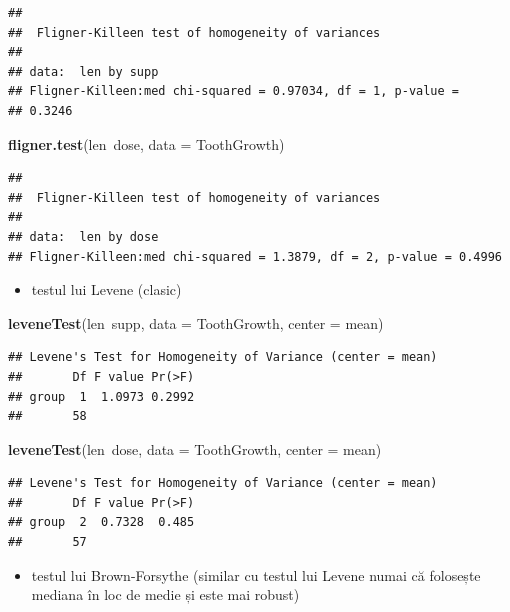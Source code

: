 \documentclass[]{article}
\newenvironment{Shaded}{\begin{snugshade}}{\end{snugshade}}
\newcommand{\KeywordTok}[1]{\textcolor[rgb]{0.13,0.29,0.53}{\textbf{{#1}}}}
\newcommand{\DataTypeTok}[1]{\textcolor[rgb]{0.13,0.29,0.53}{{#1}}}
\newcommand{\NormalTok}[1]{{#1}}
\providecommand{\tightlist}{%
  \setlength{\itemsep}{0pt}\setlength{\parskip}{0pt}}
\begin{document}
\begin{verbatim}
## 
##  Fligner-Killeen test of homogeneity of variances
## 
## data:  len by supp
## Fligner-Killeen:med chi-squared = 0.97034, df = 1, p-value =
## 0.3246
\end{verbatim}

\begin{Shaded}
\begin{Highlighting}[]
\KeywordTok{fligner.test}\NormalTok{(len~dose, }\DataTypeTok{data =} \NormalTok{ToothGrowth)}
\end{Highlighting}
\end{Shaded}

\begin{verbatim}
## 
##  Fligner-Killeen test of homogeneity of variances
## 
## data:  len by dose
## Fligner-Killeen:med chi-squared = 1.3879, df = 2, p-value = 0.4996
\end{verbatim}

\begin{itemize}
\tightlist
\item
  testul lui Levene (clasic)
\end{itemize}

\begin{Shaded}
\begin{Highlighting}[]
\KeywordTok{leveneTest}\NormalTok{(len~supp, }\DataTypeTok{data =} \NormalTok{ToothGrowth, }\DataTypeTok{center =} \NormalTok{mean)}
\end{Highlighting}
\end{Shaded}

\begin{verbatim}
## Levene's Test for Homogeneity of Variance (center = mean)
##       Df F value Pr(>F)
## group  1  1.0973 0.2992
##       58
\end{verbatim}

\begin{Shaded}
\begin{Highlighting}[]
\KeywordTok{leveneTest}\NormalTok{(len~dose, }\DataTypeTok{data =} \NormalTok{ToothGrowth, }\DataTypeTok{center =} \NormalTok{mean)}
\end{Highlighting}
\end{Shaded}

\begin{verbatim}
## Levene's Test for Homogeneity of Variance (center = mean)
##       Df F value Pr(>F)
## group  2  0.7328  0.485
##       57
\end{verbatim}

\begin{itemize}
\tightlist
\item
  testul lui Brown-Forsythe (similar cu testul lui Levene numai că
  folosește mediana în loc de medie și este mai robust)
\end{itemize}
\end{document}
